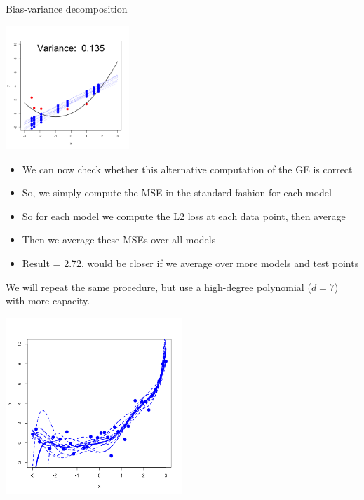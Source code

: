 \documentclass[11pt,compress,t,notes=noshow, xcolor=table]{beamer}
\begin{document}
\begin{vbframe} {Bias-variance decomposition}
\framebreak

\begin{center}
  \includegraphics[width = 0.35\textwidth]{figure/bias_variance_decomposition-linear_model_variance.png}
\end{center}

\begin{footnotesize}

\begin{itemize}
  \item We can now check whether this alternative computation of the GE is correct
  \item So, we simply compute the MSE in the standard fashion for each model
  \item So for each model we compute the L2 loss at each data point, then average
  \item Then we average these MSEs over all models
  \item Result = 2.72, would be closer if we average over more models and test points 
\end{itemize}

\end{footnotesize}


\framebreak


We will repeat the same procedure, but use a high-degree polynomial ($d=7$) with more capacity.

\begin{center}
  \includegraphics[width = 0.5\textwidth]{figure/bias_variance_decomposition-complex_model.png}
\end{center}



\end{vbframe}
\end{document}
